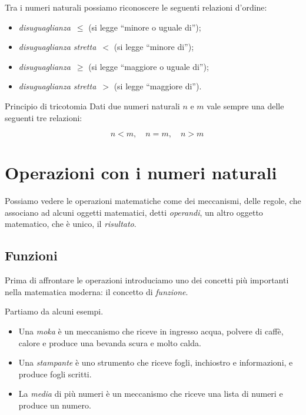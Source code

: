 \bigskip
Tra i numeri naturali possiamo riconoscere le seguenti relazioni 
d'ordine: \begin{itemize} [nosep]
\item \emph{disuguaglianza}~\(\leqslant\) 
(si legge ``minore o uguale di'');
\item \emph{disuguaglianza stretta}~\(<\) 
(si legge ``minore di'');
\item \emph{disuguaglianza}~\(\geqslant\) 
(si legge ``maggiore o uguale di'');
\item \emph{disuguaglianza stretta}~\(>\) 
(si legge ``maggiore di'').
\end{itemize}

\begin{postulato}{Principio di tricotomia}{}
Dati due numeri naturali \(n\) e \(m\) vale sempre una delle seguenti tre 
relazioni: 

\vspace{-1em}
\[\quad n < m,\quad n = m, \quad n > m\]
\end{postulato}

\section{Operazioni con i numeri naturali}
\label{sec:nat_operazioni}

Possiamo vedere le operazioni matematiche 
come dei meccanismi, delle regole, 
che associano ad alcuni oggetti matematici, detti \emph{operandi}, 
un altro oggetto matematico, che è unico, il \emph{risultato}.

\subsection{Funzioni}

Prima di affrontare le operazioni introduciamo uno dei concetti più 
importanti nella matematica moderna: il concetto di 
\emph{funzione}.

\begin{esempi}{}{}
Partiamo da alcuni esempi.
\begin{itemize} [noitemsep]
\item Una \emph{moka} è un meccanismo che riceve in ingresso acqua, 
polvere di caffè, calore e produce una bevanda scura e molto calda.
\item Una \emph{stampante} è uno strumento che riceve fogli, 
inchiostro e informazioni, e produce fogli scritti.
\item La \emph{media} di più numeri è un meccanismo che riceve una 
lista di numeri e produce un numero.
\end{itemize}
\end{esempi}

